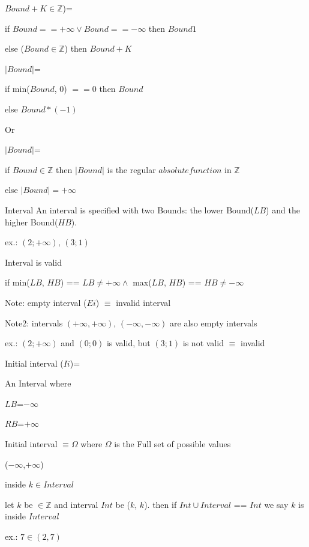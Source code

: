 \begin{definition}{$Bound+K \in \mathbb{Z}$)=}
	
	if $Bound == +\infty \lor Bound == -\infty$ then $Bound1$
	
	else ($Bound \in \mathbb{Z}$) then $Bound+K$
\end{definition}

\begin{definition}{$|Bound|$=}
	
	if min($Bound$, $0$) $==0$ then $Bound$
	
	else $Bound*(-1)$
\end{definition}

Or

\begin{definition}{$|Bound|$=}
	
	if $Bound \in  \mathbb{Z}$ then $|Bound|$ is the regular $absolute function$ in $\mathbb{Z}$
	
	else $|Bound| = +\infty$
\end{definition}

\begin{definition}{Interval}
	An interval is specified with two Bounds: the lower Bound($LB$) and the higher Bound($HB$).
	
	ex.: $(2;+\infty)$, $(3;1)$
\end{definition}

\begin{definition}{Interval is valid}
	
	if min($LB$, $HB$) == $LB \neq +\infty \land$ max($LB$, $HB$) == $HB  \neq -\infty$
	
	Note: empty interval ($Ei$) $\equiv$ invalid interval
	
	Note2: intervals $(+\infty, +\infty)$, $(-\infty, -\infty)$ are also empty intervals 
	
	ex.: $(2;+\infty)$ and $(0;0)$ is valid, but $(3;1)$ is not valid $\equiv$ invalid
\end{definition}

\begin{definition}{Initial interval ($Ii$)=}
	
	An Interval where
	
	$LB$=$-\infty$
	
	$RB$=$+\infty$
	
	Initial interval $\equiv \Omega$ where $\Omega$ is the Full set of possible values
	
	($-\infty$,$+\infty$)
\end{definition}

\begin{definition}{inside $k \in Interval$}
	
	let $k$ be $\in \mathbb{Z}$ and interval $Int$ be ($k$, $k$). then if $Int \cup Interval$ == $Int$ we say $k$ is inside $Interval$
	
	ex.: $7 \in (2,7)$
\end{definition}


